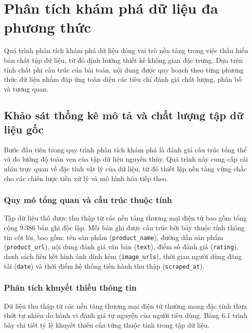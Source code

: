 \section{Phân tích khám phá dữ liệu đa phương thức}

Quá trình phân tích khám phá dữ liệu đóng vai trò nền tảng trong việc thấu hiểu bản chất tập dữ liệu, từ đó định hướng thiết kế không gian đặc trưng. Dựa trên tính chất phi cấu trúc của bài toán, nội dung được quy hoạch theo từng phương thức dữ liệu nhằm đáp ứng toàn diện các tiêu chí đánh giá chất lượng, phân bố và tương quan.

\subsection{Khảo sát thống kê mô tả và chất lượng tập dữ liệu gốc}

Bước đầu tiên trong quy trình phân tích khám phá là đánh giá cấu trúc tổng thể và đo lường độ toàn vẹn của tập dữ liệu nguyên thủy. Quá trình này cung cấp cái nhìn trực quan về đặc tính vật lý của dữ liệu, từ đó thiết lập nền tảng vững chắc cho các chiến lược tiền xử lý và mô hình hóa tiếp theo.

\subsubsection{Quy mô tổng quan và cấu trúc thuộc tính}

Tập dữ liệu thô được thu thập từ các nền tảng thương mại điện tử bao gồm tổng cộng 9.386 bản ghi độc lập. Mỗi bản ghi được cấu trúc bởi bảy thuộc tính thông tin cốt lõi, bao gồm: tên sản phẩm (\texttt{product\_name}), đường dẫn sản phẩm (\texttt{product\_url}), nội dung đánh giá văn bản (\texttt{text}), điểm số đánh giá (\texttt{rating}), danh sách liên kết hình ảnh đính kèm (\texttt{image\_urls}), thời gian người dùng đăng tải (\texttt{date}) và thời điểm hệ thống tiến hành thu thập (\texttt{scraped\_at}).

\subsubsection{Phân tích khuyết thiếu thông tin}

Dữ liệu thu thập từ các nền tảng thương mại điện tử thường mang đặc tính thưa thớt tự nhiên do hành vi đánh giá tự nguyện của người tiêu dùng. Bảng 6.1 trình bày chi tiết tỷ lệ khuyết thiếu của từng thuộc tính trong tập dữ liệu.


